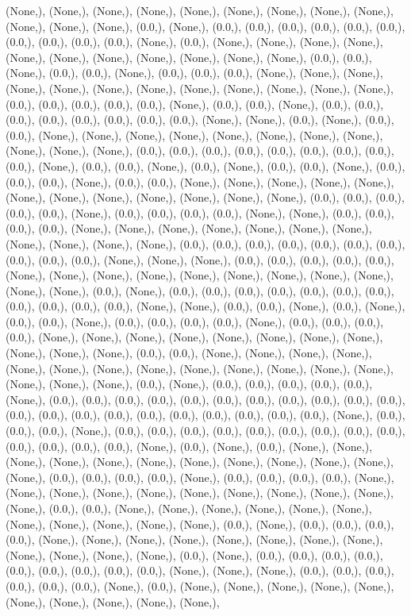 \documentclass{article}
\begin{document}
(None,), (None,), (None,), (None,), (None,), (None,), (None,), (None,), (None,), (None,), (None,), (None,), (0.0,), (None,), (0.0,), (0.0,), (0.0,), (0.0,), (0.0,), (0.0,), (0.0,), (0.0,), (0.0,), (0.0,), (None,), (0.0,), (None,), (None,), (None,), (None,), (None,), (None,), (None,), (None,), (None,), (None,), (None,), (0.0,), (0.0,), (None,), (0.0,), (0.0,), (None,), (0.0,), (0.0,), (0.0,), (None,), (None,), (None,), (None,), (None,), (None,), (None,), (None,), (None,), (None,), (None,), (None,), (0.0,), (0.0,), (0.0,), (0.0,), (0.0,), (None,), (0.0,), (0.0,), (None,), (0.0,), (0.0,), (0.0,), (0.0,), (0.0,), (0.0,), (0.0,), (0.0,), (None,), (None,), (0.0,), (None,), (0.0,), (0.0,), (None,), (None,), (None,), (None,), (None,), (None,), (None,), (None,), (None,), (None,), (None,), (0.0,), (0.0,), (0.0,), (0.0,), (0.0,), (0.0,), (0.0,), (0.0,), (0.0,), (None,), (0.0,), (0.0,), (None,), (0.0,), (None,), (0.0,), (0.0,), (None,), (0.0,), (0.0,), (0.0,), (None,), (0.0,), (0.0,), (None,), (None,), (None,), (None,), (None,), (None,), (None,), (None,), (None,), (None,), (None,), (None,), (0.0,), (0.0,), (0.0,), (0.0,), (0.0,), (None,), (0.0,), (0.0,), (0.0,), (0.0,), (None,), (None,), (0.0,), (0.0,), (0.0,), (0.0,), (None,), (None,), (None,), (None,), (None,), (None,), (None,), (None,), (None,), (None,), (None,), (0.0,), (0.0,), (0.0,), (0.0,), (0.0,), (0.0,), (0.0,), (0.0,), (0.0,), (0.0,), (None,), (None,), (None,), (0.0,), (0.0,), (0.0,), (0.0,), (0.0,), (None,), (None,), (None,), (None,), (None,), (None,), (None,), (None,), (None,), (None,), (None,), (0.0,), (None,), (0.0,), (0.0,), (0.0,), (0.0,), (0.0,), (0.0,), (0.0,), (0.0,), (0.0,), (0.0,), (0.0,), (None,), (None,), (0.0,), (0.0,), (None,), (0.0,), (None,), (0.0,), (0.0,), (None,), (0.0,), (0.0,), (0.0,), (0.0,), (None,), (0.0,), (0.0,), (0.0,), (0.0,), (None,), (None,), (None,), (None,), (None,), (None,), (None,), (None,), (None,), (None,), (None,), (0.0,), (0.0,), (None,), (None,), (None,), (None,), (None,), (None,), (None,), (None,), (None,), (None,), (None,), (None,), (None,), (None,), (None,), (None,), (0.0,), (None,), (0.0,), (0.0,), (0.0,), (0.0,), (0.0,), (None,), (0.0,), (0.0,), (0.0,), (0.0,), (0.0,), (0.0,), (0.0,), (0.0,), (0.0,), (0.0,), (0.0,), (0.0,), (0.0,), (0.0,), (0.0,), (0.0,), (0.0,), (0.0,), (0.0,), (0.0,), (0.0,), (None,), (0.0,), (0.0,), (0.0,), (None,), (0.0,), (0.0,), (0.0,), (0.0,), (0.0,), (0.0,), (0.0,), (0.0,), (0.0,), (0.0,), (0.0,), (0.0,), (0.0,), (None,), (0.0,), (None,), (0.0,), (None,), (None,), (None,), (None,), (None,), (None,), (None,), (None,), (None,), (None,), (None,), (None,), (0.0,), (0.0,), (0.0,), (0.0,), (None,), (0.0,), (0.0,), (0.0,), (0.0,), (None,), (None,), (None,), (None,), (None,), (None,), (None,), (None,), (None,), (None,), (None,), (0.0,), (0.0,), (None,), (None,), (None,), (None,), (None,), (None,), (None,), (None,), (None,), (None,), (None,), (0.0,), (None,), (0.0,), (0.0,), (0.0,), (0.0,), (None,), (None,), (None,), (None,), (None,), (None,), (None,), (None,), (None,), (None,), (None,), (None,), (0.0,), (None,), (0.0,), (0.0,), (0.0,), (0.0,), (0.0,), (0.0,), (0.0,), (0.0,), (0.0,), (None,), (None,), (None,), (0.0,), (0.0,), (0.0,), (0.0,), (0.0,), (0.0,), (None,), (0.0,), (None,), (None,), (None,), (None,), (None,), (None,), (None,), (None,), (None,), (None,), 
\end{document}
